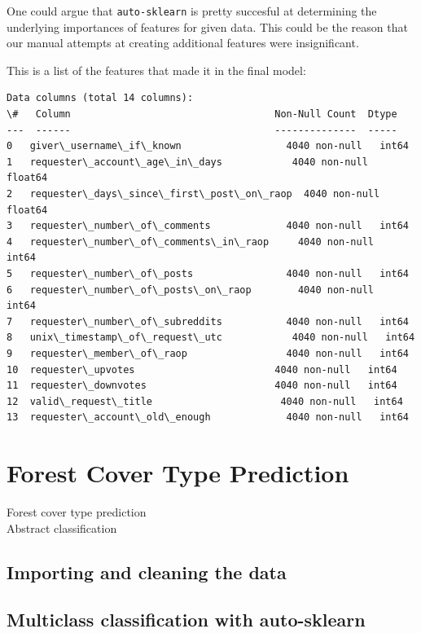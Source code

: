 \documentclass[a4paper, 12pt, twoside]{report}
\begin{document}
One could argue that \verb|auto-sklearn| is pretty succesful at determining the underlying importances of features for given data. This could be the reason that our manual attempts at creating additional features were insignificant.

This is a list of the features that made it in the final model:

\begin{Verbatim}[commandchars=\\\{\}]
Data columns (total 14 columns):
\#   Column                                   Non-Null Count  Dtype
---  ------                                   --------------  -----
0   giver\_username\_if\_known                  4040 non-null   int64
1   requester\_account\_age\_in\_days            4040 non-null   float64
2   requester\_days\_since\_first\_post\_on\_raop  4040 non-null   float64
3   requester\_number\_of\_comments             4040 non-null   int64
4   requester\_number\_of\_comments\_in\_raop     4040 non-null   int64
5   requester\_number\_of\_posts                4040 non-null   int64
6   requester\_number\_of\_posts\_on\_raop        4040 non-null   int64
7   requester\_number\_of\_subreddits           4040 non-null   int64
8   unix\_timestamp\_of\_request\_utc            4040 non-null   int64
9   requester\_member\_of\_raop                 4040 non-null   int64
10  requester\_upvotes                        4040 non-null   int64
11  requester\_downvotes                      4040 non-null   int64
12  valid\_request\_title                      4040 non-null   int64
13  requester\_account\_old\_enough             4040 non-null   int64
\end{Verbatim}


\clearpage

\section{Forest Cover Type Prediction}
\label{sec:multiclass-classification}
Forest cover type prediction\\
Abstract classification

\subsection{Importing and cleaning the data}

\subsection{Multiclass classification with auto-sklearn}
\end{document}
